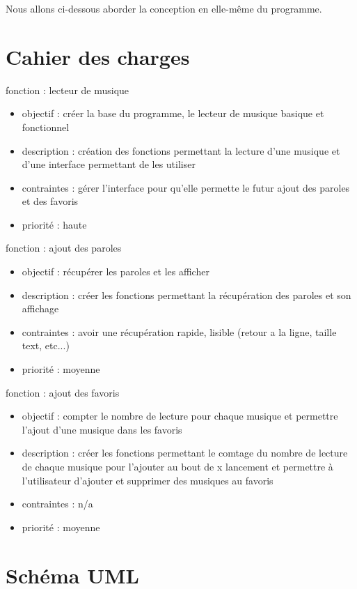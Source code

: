 \documentclass[a4paper,12pt]{report} %
\begin{document}
	Nous allons ci-dessous aborder la conception en elle-même du programme.

\section{Cahier des charges}

	fonction    : lecteur de musique
	\begin{itemize}
		\item objectif    : créer la base du programme, le lecteur de musique basique et fonctionnel
		\item description : création des fonctions permettant la lecture d'une musique et d'une interface permettant de les utiliser
		\item contraintes : gérer l'interface pour qu'elle permette le futur ajout des paroles et des favoris
		\item priorité    : haute
	\end{itemize}
	\vspace{3mm}
	fonction    : ajout des paroles
	\begin{itemize}
		\item objectif    : récupérer les paroles et les afficher
		\item description : créer les fonctions permettant la récupération des paroles et son affichage 
		\item contraintes : avoir une récupération rapide, lisible (retour a la ligne, taille text, etc...)
		\item priorité    : moyenne
	\end{itemize}
	\vspace{3mm}
	fonction    : ajout des favoris
	\begin{itemize}
		\item objectif    : compter le nombre de lecture pour chaque musique et permettre l'ajout d'une musique dans les favoris
		\item description : créer les fonctions permettant le comtage du nombre de lecture de chaque musique pour l'ajouter au bout de x lancement et permettre à l'utilisateur d'ajouter et supprimer des musiques au favoris
		\item contraintes : n/a
		\item priorité    : moyenne
	\end{itemize}
	
\section{Schéma UML}
\end{document}
